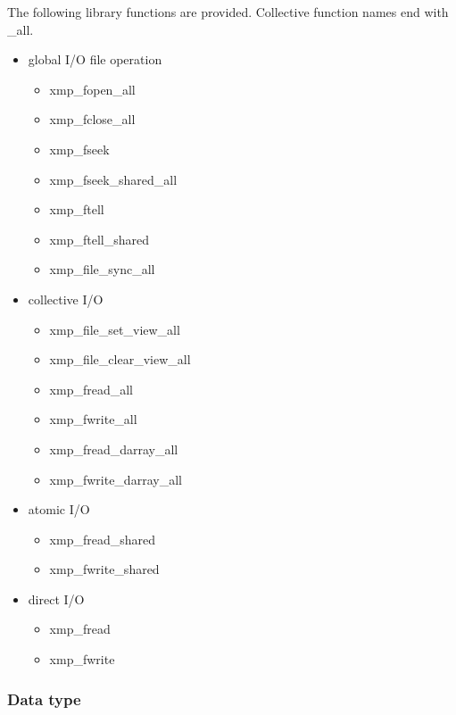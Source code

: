    The following library functions are provided.
   Collective function names end with \_all.

   \begin{itemize}
    \item global I/O file operation
    \begin{itemize}
     \item xmp\_fopen\_all
     \item xmp\_fclose\_all
     \item xmp\_fseek
     \item xmp\_fseek\_shared\_all
     \item xmp\_ftell
     \item xmp\_ftell\_shared
     \item xmp\_file\_sync\_all
    \end{itemize}
    \item collective I/O
    \begin{itemize}
     \item xmp\_file\_set\_view\_all
     \item xmp\_file\_clear\_view\_all
     \item xmp\_fread\_all
     \item xmp\_fwrite\_all
     \item xmp\_fread\_darray\_all
     \item xmp\_fwrite\_darray\_all
    \end{itemize}
    \item atomic I/O
    \begin{itemize}
     \item xmp\_fread\_shared
     \item xmp\_fwrite\_shared
    \end{itemize}
    \item direct I/O
    \begin{itemize}
     \item xmp\_fread
     \item xmp\_fwrite
    \end{itemize}
   \end{itemize}

   \clearpage
   
   \subsubsection{Data type}

